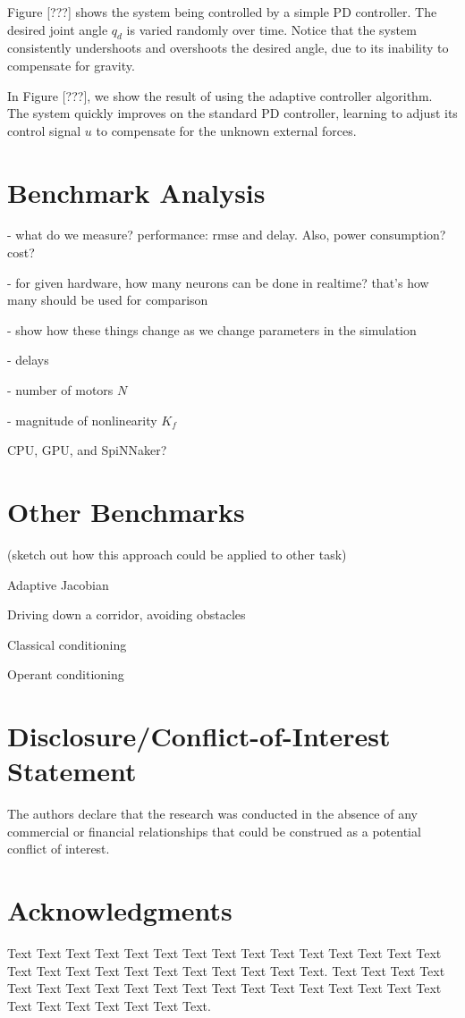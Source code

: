 \documentclass{frontiersSCNS} %
\begin{document}
Figure [???] shows the system being controlled by a simple PD controller.
The desired joint angle $q_d$ is varied randomly over time.  Notice that the
system consistently undershoots and overshoots the desired angle, due to
its inability to compensate for gravity.

In Figure [???], we show the result of using the adaptive controller algorithm.
The system quickly improves on the standard PD controller, learning to adjust
its control signal $u$ to compensate for the unknown external forces.

\section{Benchmark Analysis}

- what do we measure?   performance: rmse and delay.  Also, power consumption?  cost?

- for given hardware, how many neurons can be done in realtime?  that's how many should be used for comparison

- show how these things change as we change parameters in the simulation

- delays

- number of motors $N$

- magnitude of nonlinearity $K_f$

CPU, GPU, and SpiNNaker?

\section{Other Benchmarks}

(sketch out how this approach could be applied to other task)

Adaptive Jacobian

Driving down a corridor, avoiding obstacles

Classical conditioning

Operant conditioning 


\section*{Disclosure/Conflict-of-Interest Statement}

The authors declare that the research was conducted in the absence of any commercial or financial relationships that could be construed as a potential conflict of interest.

\section*{Acknowledgments}
Text Text Text Text Text Text  Text Text Text Text Text Text Text Text  Text Text Text Text Text Text Text Text Text  Text Text Text. Text Text Text Text Text Text  Text Text Text Text Text Text Text Text  Text Text Text Text Text Text Text Text Text  Text Text Text. 
\end{document}
